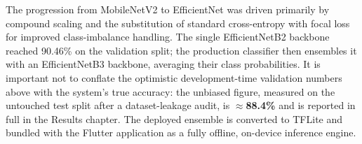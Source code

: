 The progression from MobileNetV2 to EfficientNet was driven primarily by
compound scaling and the substitution of standard cross-entropy with focal loss
for improved class-imbalance handling. The single EfficientNetB2 backbone reached
90.46\% on the validation split; the production classifier then ensembles it with
an EfficientNetB3 backbone, averaging their class probabilities. It is important
not to conflate the optimistic development-time validation numbers above with the
system's true accuracy: the unbiased figure, measured on the untouched test split
after a dataset-leakage audit, is $\approx$\textbf{88.4\%} and is reported in full
in the Results chapter. The deployed ensemble is converted to TFLite and bundled
with the Flutter application as a fully offline, on-device inference engine.
